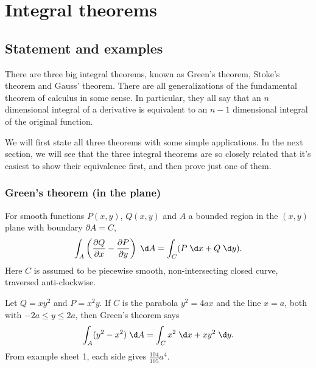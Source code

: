 \documentclass[a4paper]{article}
\begin{document}
\section{Integral theorems}
\subsection{Statement and examples}
There are three big integral theorems, known as Green's theorem, Stoke's theorem and Gauss' theorem. There are all generalizations of the fundamental theorem of calculus in some sense. In particular, they all say that an $n$ dimensional integral of a derivative is equivalent to an $n - 1$ dimensional integral of the original function.

We will first state all three theorems with some simple applications. In the next section, we will see that the three integral theorems are so closely related that it's easiest to show their equivalence first, and then prove just one of them.

\subsubsection{Green's theorem (in the plane)}
\begin{thm}
  For smooth functions $P(x, y)$, $Q(x, y)$ and $A$ a bounded region in the $(x, y)$ plane with boundary $\partial A = C$,
  \[
    \int_A \left(\frac{\partial Q}{\partial x} - \frac{\partial P}{\partial y}\right)\;\d A = \int_C(P\;\d x + Q\;\d y).
  \]
  Here $C$ is assumed to be piecewise smooth, non-intersecting closed curve, traversed anti-clockwise.
\end{thm}

\begin{eg}
  Let $Q = xy^2$ and $P = x^2y$. If $C$ is the parabola $y^2 = 4ax$ and the line $x = a$, both with $-2a \leq y \leq 2a$, then Green's theorem says
  \[
    \int_A (y^2 - x^2)\;\d A = \int_C x^2 \;\d x + xy^2\;\d y.
  \]
  From example sheet 1, each side gives $\frac{104}{105} a^4$.
\end{eg}
\end{document}
